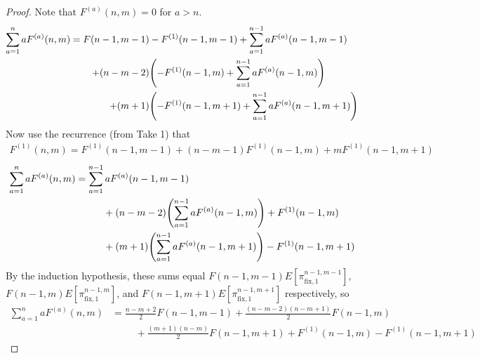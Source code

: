 \documentclass{article}
\let\originalleft\left
\let\originalright\right
\renewcommand{\left}{\mathopen{}\mathclose\bgroup\originalleft}
\renewcommand{\right}{\aftergroup\egroup\originalright}
\begin{document}
  \begin{proof}
    Note that $F^{(a)}(n, m) = 0$ for $a > n$.
    \begin{equation}
      \begin{split}
        \sum_{a=1}^n aF^{(a)}(n, m) =
        F(n-1, m-1) &-F^{(1)}(n-1, m-1) + \sum_{a=1}^{n-1} a F^{(a)}(n-1, m-1) \\
        + (n - m - 2)&\left(-F^{(1)}(n-1, m) + \sum_{a=1}^{n-1} a F^{(a)}(n-1, m)\right) \\
        + (m + 1)&\left(-F^{(1)}(n-1, m+1) + \sum_{a=1}^{n-1} a F^{(a)}(n-1, m+1)\right)
      \end{split}
    \end{equation}
      Now use the recurrence (from Take 1) that \begin{align}
      F^{(1)}(n, m) = F^{(1)}(n - 1, m-1) +
        (n - m - 1)F^{(1)}(n - 1, m) +
        mF^{(1)}(n-1, m + 1)
      \end{align}
    \begin{align}
      \sum_{a=1}^n aF^{(a)}(n, m)
      &= \sum_{a=1}^{n-1} a F^{(a)}(n-1, m-1) \\
      &\hspace{1cm} + (n - m - 2)\left(\sum_{a=1}^{n-1} a F^{(a)}(n-1, m)\right) + F^{(1)}(n-1, m)\\
      &\hspace{1cm} + (m + 1)\left(\sum_{a=1}^{n-1} a F^{(a)}(n-1, m+1)\right) -F^{(1)}(n-1, m+1)
    \end{align}
    By the induction hypothesis, these sums equal $F(n-1, m-1)E[\pi_{\text{fix},1}^{n-1,m-1}]$, $F(n-1, m)E[\pi_{\text{fix},1}^{n-1,m}]$, and $F(n-1, m + 1)E[\pi_{\text{fix},1}^{n-1,m + 1}]$ respectively, so
    \begin{align}
      \sum_{a=1}^n aF^{(a)}(n, m)
      &= \frac{n-m+2}{2}F(n-1, m-1) + \frac{(n-m-2)(n-m+1)}{2}F(n-1, m) \\
      &\hspace{1cm}
      + \frac{(m+1)(n-m)}{2}F(n-1, m+1)
      + F^{(1)}(n-1, m)
      - F^{(1)}(n-1, m+1)
    \end{align}
  \end{proof}
\pagebreak
\end{document}
